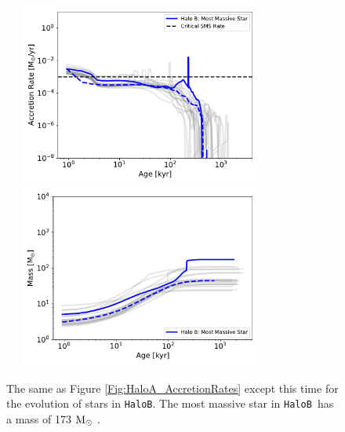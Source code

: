 \documentclass[twocolumn,iop,revtex4]{openjournal}
\newcommand{\msolar} {$\rm{M_{\odot}}~$}
\newcommand{\hb} {\texttt{HaloB~}}
\newcommand{\hbc} {\texttt{HaloB}}
\begin{document}


\begin{figure}
\centering
\begin{minipage}{175mm}      \begin{center}
    \centerline{
      \includegraphics[width=9.0cm, height=6cm]{FIGURES/AccretionRate_HaloB.pdf}
      \includegraphics[width=9.0cm, height=6cm]{FIGURES/Mass_HaloB.pdf}}
    \caption{
      The same as Figure \ref{Fig:HaloA_AccretionRates} except this time for the
      evolution of stars in \hbc. The most massive star in \hb has a mass of 173 \msolar. 
    }
\label{Fig:HaloB_AccretionRates}
\end{center} \end{minipage}
\end{figure}

\end{document}
